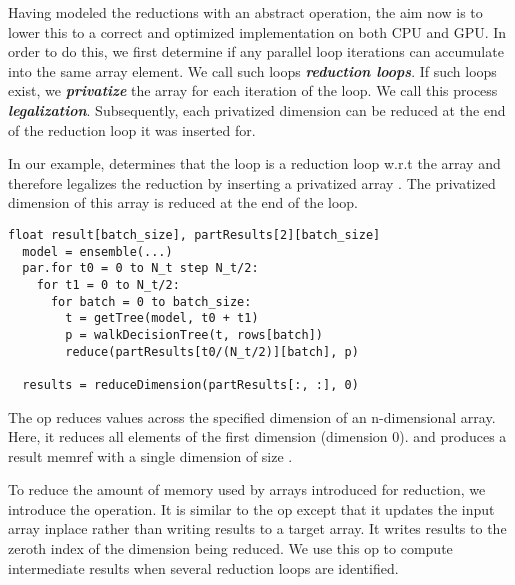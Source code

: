 Having modeled the reductions with an abstract operation, the 
aim now is to lower this to a correct and optimized 
implementation on both CPU and GPU. In order to do this, we 
first determine if any parallel loop iterations can accumulate 
into the same array element. We call such loops 
\emph{\textbf{reduction loops}}. If such loops exist, we 
\textbf{\emph{privatize}} the array for each iteration of the
loop. We call this process \textbf{\emph{legalization}}.
Subsequently, each privatized dimension 
can be reduced at the end of the reduction loop it was inserted for. 

In our example, \Treebeard{} determines that the  loop is a reduction 
loop w.r.t the  array and therefore legalizes 
the reduction by inserting a privatized array 
. The privatized dimension of this array 
is reduced at the end of the  loop.

\begin{lstlisting}[style=c++]
  float result[batch_size], partResults[2][batch_size]
  model = ensemble(...) 
  par.for t0 = 0 to N_t step N_t/2:
    for t1 = 0 to N_t/2:
      for batch = 0 to batch_size:
        t = getTree(model, t0 + t1) 
        p = walkDecisionTree(t, rows[batch])
        reduce(partResults[t0/(N_t/2)][batch], p)
  
  results = reduceDimension(partResults[:, :], 0)
\end{lstlisting}

The op  reduces values across the specified
dimension of an n-dimensional array. Here, 
it reduces all elements of the first dimension (dimension 0). 
and produces a result memref with a single dimension of size .

To reduce the amount of memory used by arrays introduced for reduction,
we introduce the  operation. It is similar to the 
 op except that it updates the input array inplace
rather than writing results to a target array. It writes results to the 
zeroth index of the dimension being reduced. We use this op to 
compute intermediate results when several reduction loops are identified.

  
